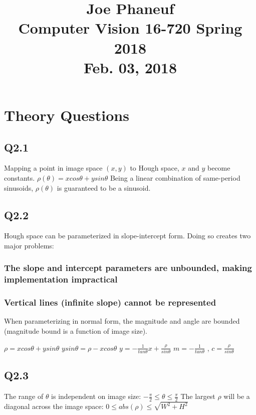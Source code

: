 \documentclass[12pt]{article}
\begin{document}
\title{Joe Phaneuf \\ Computer Vision 16-720 Spring 2018 \\ Feb. 03, 2018 }
\date{}
\author{}



\section{Theory Questions}

\subsection{Q2.1  }
Mapping a point in image space $(x,y)$ to Hough space, $x$ and $y$ become constants.  
$\rho(\theta) = x cos \theta + y sin \theta$  
Being a linear combination of same-period sinusoids, $\rho(\theta)$ is guaranteed to be a sinusoid.  

\subsection{Q2.2  }
Hough space can be parameterized in slope-intercept form.  
Doing so creates two major problems:  

\subsubsection{The slope and intercept parameters are unbounded, making implementation impractical}

\subsubsection{Vertical lines (infinite slope) cannot be represented  }

When parameterizing in normal form, the magnitude and angle are bounded (magnitude bound is a function of image size).

$\rho = x cos \theta + y sin \theta$  
$y sin \theta = \rho - x cos \theta$  
$y = - \frac{1}{tan \theta} x + \frac{\rho}{sin \theta}$  
$m =- \frac{1}{tan \theta}$ , $c = \frac{\rho}{sin \theta}$  

\subsection{Q2.3  }
The range of $\theta$ is independent on image size: $- \frac{\pi}{2} \leq \theta \leq \frac{\pi}{2}$  
The largest $\rho$ will be a diagonal across the image space: $0 \leq abs(\rho) \leq \sqrt{W^{2} + H^{2}}$
\end{document}
